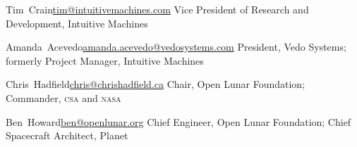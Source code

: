 \documentclass[12pt,letterpaper]{article}
\newcommand{\rdate}[1]{{\hfill #1}}
\begin{document}
\medskip
Tim~Crain\rdate{\href{mailto:tim@intuitivemachines.com}{tim@intuitivemachines.com}}\newline
Vice President of Research and Development, Intuitive Machines

\medskip
Amanda~Acevedo\rdate{\href{mailto:amanda.acevedo@vedosystems.com}{amanda.acevedo@vedosystems.com}}\newline
President, Vedo Systems; formerly Project Manager, Intuitive Machines

\medskip
Chris~Hadfield\rdate{\href{mailto:chris@chrishadfield.ca}{chris@chrishadfield.ca}}\newline
Chair, Open Lunar Foundation; Commander, \textsc{csa} and \textsc{nasa}

\medskip
Ben~Howard\rdate{\href{mailto:ben@openlunar.org}{ben@openlunar.org}}\newline
Chief Engineer, Open Lunar Foundation; Chief Spacecraft Architect, Planet

\end{document}
